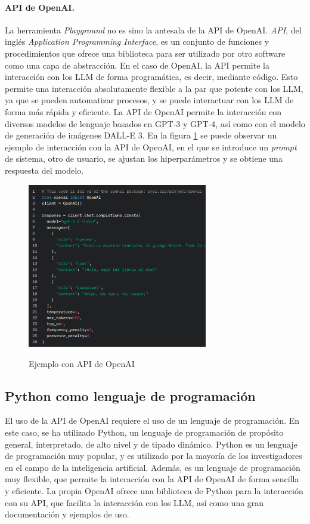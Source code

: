         \paragraph{API de OpenAI.} La herramienta \textit{Playground} no es sino la antesala de la API de OpenAI. \textit{API}, del inglés \textit{Application Programming Interface}, es un conjunto de funciones y procedimientos que ofrece una biblioteca para ser utilizado por otro software como una capa de abstracción. En el caso de OpenAI, la API permite la interacción con los LLM de forma programática, es decir, mediante código. Esto permite una interacción absolutamente flexible a la par que potente con los LLM, ya que se pueden automatizar procesos, y se puede interactuar con los LLM de forma más rápida y eficiente. La API de OpenAI permite la interacción con diversos modelos de lenguaje basados en GPT-3 y GPT-4, así como con el modelo de generación de imágenes DALL-E 3. En la figura \ref{fig:api} se puede observar un ejemplo de interacción con la API de OpenAI, en el que se introduce un \textit{prompt} de sistema, otro de usuario, se ajustan los hiperparámetros y se obtiene una respuesta del modelo.

        \begin{figure}[h]
            \caption[Ejemplo con API de OpenAI]{Ejemplo con API de OpenAI}
            \centering
            \includegraphics[width=0.7\textwidth]{./figuras/ejemplo_API.png}
            \label{fig:api}
        \end{figure}

    \subsection{Python como lenguaje de programación}
    El uso de la API de OpenAI requiere el uso de un lenguaje de programación. En este caso, se ha utilizado Python, un lenguaje de programación de propósito general, interpretado, de alto nivel y de tipado dinámico. Python es un lenguaje de programación muy popular, y es utilizado por la mayoría de los investigadores en el campo de la inteligencia artificial. Además, es un lenguaje de programación muy flexible, que permite la interacción con la API de OpenAI de forma sencilla y eficiente. La propia OpenAI ofrece una biblioteca de Python para la interacción con su API, que facilita la interacción con los LLM, así como una gran documentación y ejemplos de uso. 

